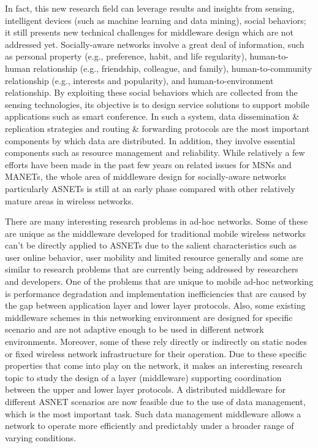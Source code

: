 In fact, this new research field can leverage results and insights from sensing, intelligent devices (such as machine learning and data mining), social behaviors; it still presents new technical challenges for middleware design which are not addressed yet. Socially-aware networks involve a great deal of information, such as personal property (e.g., preference, habit, and life regularity), human-to-human relationship (e.g., friendship, colleague, and family), human-to-community relationship (e.g., interests and popularity), and human-to-environment relationship. By exploiting these social behaviors which are collected from the sensing technologies, its objective is to design service solutions to support mobile applications such as smart conference. In such a system, data dissemination \& replication strategies and routing \& forwarding protocols are the most important components by which data are distributed. In addition, they involve essential components such as resource management and reliability. While relatively a few efforts have been made in the past few years on related issues for MSNs and MANETs, the whole area of middleware design for socially-aware networks particularly ASNETs is still at an early phase compared with other relatively mature areas in wireless networks.

There are many interesting research problems in ad-hoc networks. Some of these are unique as the middleware developed for traditional mobile wireless networks can't be directly applied to ASNETs due to the salient characteristics such as user online behavior, user mobility and limited resource generally and some are similar to research problems that are currently being addressed by researchers and developers. One of the problems that are unique to mobile ad-hoc networking is performance degradation and implementation inefficiencies that are caused by the gap between application layer and lower layer protocols. Also, some existing middleware schemes in this networking environment are designed for specific scenario and are not adaptive enough to be used in different network environments. Moreover, some of these rely directly or indirectly on static nodes or fixed wireless network infrastructure for their operation. Due to these specific properties that come into play on the network, it makes an interesting research topic to study the design of a layer (middleware) supporting coordination between the upper and lower layer protocols. A distributed middleware for different ASNET scenarios are now feasible due to the use of data management, which is the most important task. Such data management middleware allows a network to operate more efficiently and predictably under a broader range of varying conditions.

